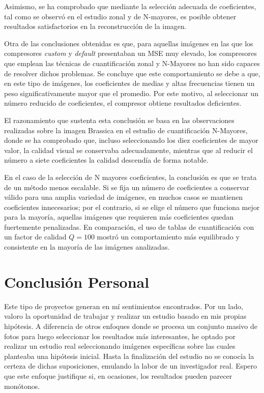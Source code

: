 \documentclass[a4paper, 12pt]{article}
\begin{document}
Asimismo, se ha comprobado que mediante la selección adecuada de coeficientes, tal como se observó en el estudio zonal y de N-mayores, es posible obtener resultados satisfactorios en la reconstrucción de la imagen.

Otra de las conclusiones obtenidas es que, para aquellas imágenes en las que los compresores \textit{custom} y \textit{default} presentaban un MSE muy elevado, los compresores que emplean las técnicas de cuantificación zonal y N-Mayores no han sido capaces de resolver dichos problemas. Se concluye que este comportamiento se debe a que, en este tipo de imágenes, los coeficientes de medias y altas frecuencias tienen un peso significativamente mayor que el promedio. Por este motivo, al seleccionar un número reducido de coeficientes, el compresor obtiene resultados deficientes.

El razonamiento que sustenta esta conclusión se basa en las observaciones realizadas sobre la imagen Brassica en el estudio de cuantificación N-Mayores, donde se ha comprobado que, incluso seleccionando los diez coeficientes de mayor valor, la calidad visual se conservaba adecuadamente, mientras que al reducir el número a siete coeficientes la calidad descendía de forma notable.


En el caso de la selección de N mayores coeficientes, la conclusión es que se trata de un método menos escalable. Si se fija un número de coeficientes a conservar válido para una amplia variedad de imágenes, en muchos casos se mantienen coeficientes innecesarios; por el contrario, si se elige el número que funciona mejor para la mayoría, aquellas imágenes que requieren más coeficientes quedan fuertemente penalizadas. En comparación, el uso de tablas de cuantificación con un factor de calidad 
$Q=100$ mostró un comportamiento más equilibrado y consistente en la mayoría de las imágenes analizadas.

\section{Conclusión Personal}

Este tipo de proyectos generan en mí sentimientos encontrados. Por un lado, valoro la oportunidad de trabajar y realizar un estudio basado en mis propias hipótesis. A diferencia de otros enfoques donde se procesa un conjunto masivo de fotos para luego seleccionar los resultados más interesantes, he optado por realizar un estudio real seleccionando imágenes específicas sobre las cuales planteaba una hipótesis inicial. Hasta la finalización del estudio no se conocía la certeza de dichas suposiciones, emulando la labor de un investigador real. Espero que este enfoque justifique si, en ocasiones, los resultados pueden parecer monótonos.
\end{document}
